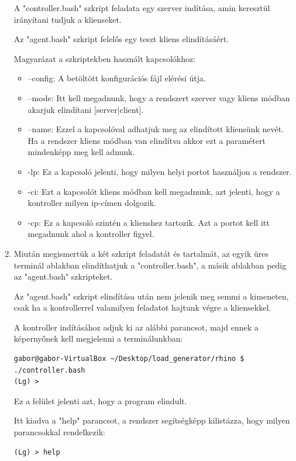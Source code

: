 \documentclass[a4paper,12pt,oneside]{report}
\begin{document}
\begin{enumerate}
A "controller.bash" szkript feladata egy szerver indítása, amin keresztül irányítani tudjuk a klienseket.

Az "agent.bash" szkript felelős egy teszt kliens elindításáért.

Magyarázat a szkriptekben használt kapcsolókhoz:

\begin{itemize}
\itemsep0em
    \item --config: A betöltött konfigurációs fájl elérési útja.
    \item --mode: Itt kell megadnunk, hogy a rendszert szerver vagy kliens módban akarjuk elindítani [server|client].
    \item --name: Ezzel a kapcsolóval adhatjuk meg az elindított kliensünk nevét. Ha a rendszer kliens módban van elindítva akkor ezt a paramétert mindenképp meg kell adnunk.
    \item -lp: Ez a kapcsoló jelenti, hogy milyen helyi portot használjon a rendszer.
    \item -ci: Ezt a kapcsolót kliens módban kell megadnunk, azt jelenti, hogy a kontroller milyen ip-címen dolgozik.
    \item -cp: Ez a kapcsoló szintén a klienshez tartozik. Azt a portot kell itt megadnunk ahol a kontroller figyel.
\end{itemize}

\item Miután megismertük a két szkript feladatát és tartalmát, az egyik üres terminál ablakban elindíthatjuk a "controller.bash", a másik ablakban pedig az "agent.bash" szkripteket.

Az "agent.bash" szkript elindítása után nem jelenik meg semmi a kimeneten, csak ha a kontrollerrel valamilyen feladatot hajtunk végre a kliensekkel.

A kontroller indításához adjuk ki az alábbi parancsot, majd ennek a képernyőnek kell megjelenni a terminálunkban:

\begin{lstlisting}
gabor@gabor-VirtualBox ~/Desktop/load_generator/rhino $ ./controller.bash
(Lg) >
\end{lstlisting}

Ez a felület jelenti azt, hogy a program elindult.

Itt kiadva a "help" parancsot, a rendszer segítségképp kilistázza, hogy milyen parancsokkal rendelkezik:

\begin{lstlisting}
(Lg) > help


\end{lstlisting}
\end{enumerate}
\end{document}
